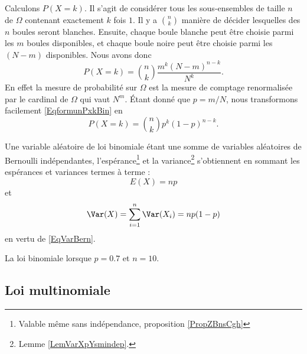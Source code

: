 Calculons \( P(X=k)\). Il s'agit de considérer tous les sous-ensembles de taille \( n\) de \( \Omega\) contenant exactement \( k\) fois \( 1\). Il y a \( {n\choose k}\) manière de décider lesquelles des \( n\) boules seront blanches. Ensuite, chaque boule blanche peut être choisie parmi les \( m\) boules disponibles, et chaque boule noire peut être choisie parmi les  \( (N-m)\) disponibles. Nous avons donc
\begin{equation}        \label{EqformunPxkBin}
    P(X=k)={n\choose k}\frac{ m^k(N-m)^{n-k} }{ N^k }.
\end{equation}
En effet la mesure de probabilité sur \( \Omega\) est la mesure de comptage renormalisée par le cardinal de \( \Omega\) qui vaut \( N^m\). Étant donné que \( p=m/N\), nous transformons facilement \eqref{EqformunPxkBin} en
\begin{equation}
    P(X=k)={n\choose k}p^k(1-p)^{n-k}.
\end{equation}

Une variable aléatoire de loi binomiale étant une somme de variables aléatoires de Bernoulli indépendantes, l'espérance\footnote{Valable même sans indépendance, proposition \ref{PropZBnsCgh}} et la variance\footnote{Lemme \ref{LemVarXpYsmindep}.} s'obtiennent en sommant les espérances et variances termes à terme  :
\begin{equation}    \label{EqDGbBgrv}
    E(X)=np
\end{equation}
et
\begin{equation}    \label{EqKLubWlh}
    \Var(X)=\sum_{i=1}^n\Var(X_i)=np(1-p)
\end{equation}
en vertu de \eqref{EqVarBern}.

La loi binomiale lorsque \( p=0.7\) et \( n=10\).       %

\begin{center}
   
\end{center}

\subsection{Loi multinomiale}

